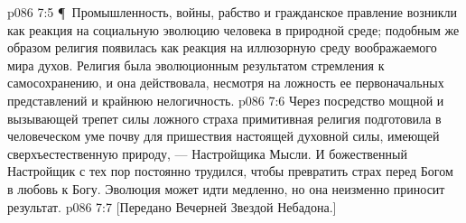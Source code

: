 \vs p086 7:5 \P\ Промышленность, войны, рабство и гражданское правление возникли как реакция на социальную эволюцию человека в природной среде; подобным же образом религия появилась как реакция на иллюзорную среду воображаемого мира духов. Религия была эволюционным результатом стремления к самосохранению, и она действовала, несмотря на ложность ее первоначальных представлений и крайнюю нелогичность.
\vs p086 7:6 Через посредство мощной и вызывающей трепет силы ложного страха примитивная религия подготовила в человеческом уме почву для пришествия настоящей духовной силы, имеющей сверхъестественную природу, --- Настройщика Мысли. И божественный Настройщик с тех пор постоянно трудился, чтобы превратить страх перед Богом в любовь к Богу. Эволюция может идти медленно, но она неизменно приносит результат.
\vs p086 7:7 [Передано Вечерней Звездой Небадона.]
